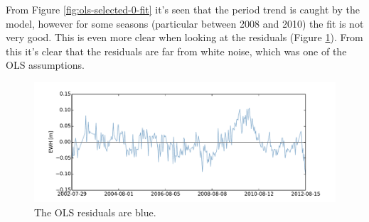 From Figure \ref{fig:ols-selected-0-fit} it's seen that the period trend is caught by the model, however for some seasons (particular between 2008 and 2010) the fit is not very good. This is even more clear when looking at the residuals (Figure \ref{fig:ols-selected-0-residual}). From this it's clear that the residuals are far from white noise, which was one of the OLS assumptions.

\begin{figure}[H]
	\centering
	\includegraphics[width=\textwidth]{figures/ols-selected-0-residual}
	\caption{The OLS residuals are blue.}
	\label{fig:ols-selected-0-residual}
\end{figure}

